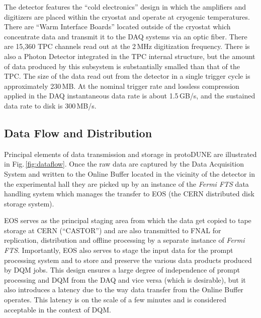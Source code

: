 \documentclass{webofc}
\newcommand{\pd}{protoDUNE\xspace}
\begin{document}
The detector features the ``cold electronics'' design in which the amplifiers and digitizers
are placed within the cryostat and operate at cryogenic temperatures. There are
``Warm Interface Boards'' located outside of the cryostat which concentrate data
and transmit it to the DAQ systems via an optic fiber.
There are 15,360 TPC channels read out at the 2\,MHz digitization frequency. There is also
a Photon Detector integrated in the TPC internal structure, but the amount of data
produced by this subsystem is substantially smalled than that of the TPC.
The size of the data read out from the detector in a single trigger cycle is approximately 230\,MB. At the nominal
trigger rate and lossless compression applied in the DAQ instantaneous data rate is about
1.5\,GB/s, and the sustained data rate to disk is 300\,MB/s.

\subsection{Data Flow and Distribution}
Principal elements of data transmission and storage in \pd are illustrated in Fig.\,\ref{fig:dataflow}.
Once the raw data are captured by the Data Acquisition System and written to the Online Buffer
located in the vicinity of the detector in the experimental hall  they are picked up by an instance of
the \textit{Fermi FTS} data handling system \cite{sam,fts} which manages the transfer to EOS \cite{castoreos}
(the CERN distributed disk storage system).

EOS serves as the principal staging area  \cite{eos_role} from which the data get copied to tape
storage at CERN (``CASTOR'')  and are also transmitted to FNAL for replication, distribution and
offline processing by a separate instance of \textit{Fermi FTS}.
Importantly, EOS also serves to stage the input data for the prompt processing system and to
store and preserve  the various data products produced by DQM jobs. This design
ensures a large degree of independence of prompt processing and DQM from the DAQ and vice versa
(which is desirable),
but it also introduces a latency due to the way data transfer from the Online Buffer operates. This latency
is on the scale of a few minutes and is considered acceptable in the context of DQM.
\end{document}
